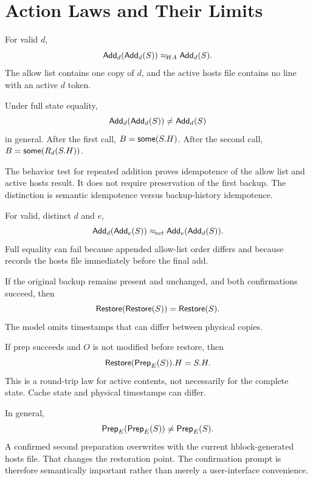 \section{Action Laws and Their Limits}

\begin{law}
\label{law:add-observational}
For valid $d$,
\[
  \mathsf{Add}_{d}(\mathsf{Add}_{d}(S))\mathrel{\approx_{\!HA}}\mathsf{Add}_{d}(S).
\]
The allow list contains one copy of $d$, and the active hosts file contains no
line with an active $d$ token.
\end{law}

\begin{boundary}
\label{boundary:add-backup}
Under full state equality,
\[
  \mathsf{Add}_{d}(\mathsf{Add}_{d}(S))\ne\mathsf{Add}_{d}(S)
\]
in general.  After the first call, $B=\mathsf{some}(S.H)$.  After the second call,
$B=\mathsf{some}(R_{d}(S.H))$.

The behavior test for repeated addition proves idempotence of the allow list
and active hosts result.  It does not require preservation of the first backup.
The distinction is semantic idempotence versus backup-history idempotence.
\end{boundary}

\begin{law}
\label{law:add-commute}
For valid, distinct $d$ and $e$,
\[
  \mathsf{Add}_{d}(\mathsf{Add}_{e}(S))\mathrel{\approx_{\!set}}\mathsf{Add}_{e}(\mathsf{Add}_{d}(S)).
\]
Full equality can fail because appended allow-list order differs and because
 records the hosts file immediately before the final add.
\end{law}

\begin{law}
\label{law:restore-idempotent}
If the original backup remains present and unchanged, and both confirmations
succeed, then
\[
  \mathsf{Restore}(\mathsf{Restore}(S))=\mathsf{Restore}(S).
\]
The model omits timestamps that can differ between physical copies.
\end{law}

\begin{law}
\label{law:roundtrip}
If prep succeeds and $O$ is not modified before restore, then
\[
  \mathsf{Restore}(\mathsf{Prep}_E(S)).H=S.H.
\]
This is a round-trip law for active contents, not necessarily for the complete
state.  Cache state and physical timestamps can differ.
\end{law}

\begin{boundary}
\label{boundary:prep}
In general,
\[
  \mathsf{Prep}_E(\mathsf{Prep}_E(S))\ne\mathsf{Prep}_E(S).
\]
A confirmed second preparation overwrites  with the current
hblock-generated hosts file.  That changes the restoration point.  The
confirmation prompt is therefore semantically important rather than merely a
user-interface convenience.
\end{boundary}

